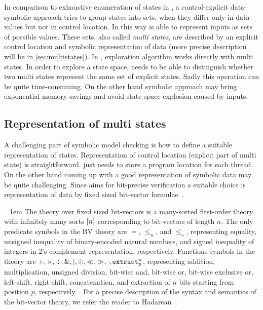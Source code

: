 In comparison to exhaustive enumeration of states in \DIVINE, a control-explicit
data-symbolic approach tries to group states into sets, when they differ only in
data values but not in control location. In this way \SymDIVINE is able to
represent inputs as sets of possible values. These sets, also called \emph{multi
states}, are described by an explicit control location and symbolic
representation of data (more precise description will be in
\autoref{sec:multistates}). In \SymDIVINE, exploration algorithm works directly
with multi states. In order to explore a state space, \SymDIVINE needs to be
able to distinguish whether two multi states represent the same set of explicit
states. Sadly this operation can be quite time-consuming. On the other hand
symbolic approach may bring exponential memory savings and avoid state space
explosion caused by inputs.

\subsection{Representation of multi states} \label{sec:multistates}

A challenging part of symbolic model checking is how to define a suitable
representation of states. Representation of control location (explicit part of
multi state) is straightforward. \SymDIVINE just needs to store
a program location for each thread. On the other hand coming up with a good
representation of symbolic data may be quite challenging. Since \SymDIVINE aims
for bit-precise verification a suitable choice is representation of data
by fixed sized bit-vector formulae~\cite{Bauch14}.

\emergencystretch=1em
The theory over fixed sized bit-vectors is a many-sorted first-order theory with
infinitely many sorts $[n]$ corresponding to bit-vectors of length $n$. The
only predicate symbols in the BV theory are $=$, $\leq_u$, and $\leq_s$,
representing equality, unsigned inequality of binary-encoded natural numbers,
and signed inequality of integers in $2$'s complement representation,
respectively. Functions symbols in the theory are $+, \times, \div, \&, \mid,
\oplus, \ll, \gg, \cdot, \texttt{extract}^{n}_{p}$, representing addition, multiplication,
unsigned division, bit-wise and, bit-wise or, bit-wise exclusive or, left-shift,
right-shift, concatenation, and extraction of $n$ bits starting from position
$p$, respectively~\cite{Jonas17}. For a precise description of the syntax and
semantics of the bit-vector theory, we refer the reader to
Hadarean~\cite{Hadarean14}.

